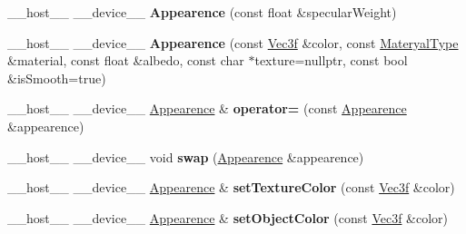 \begin{DoxyCompactItemize}
\item 
\+\_\+\+\_\+host\+\_\+\+\_\+ \+\_\+\+\_\+device\+\_\+\+\_\+ {\bfseries Appearence} (const float \&specular\+Weight)\hypertarget{struct_appearence_a457a7a1d0c4a661efb5448d01655e537}{}\label{struct_appearence_a457a7a1d0c4a661efb5448d01655e537}

\item 
\+\_\+\+\_\+host\+\_\+\+\_\+ \+\_\+\+\_\+device\+\_\+\+\_\+ {\bfseries Appearence} (const \hyperlink{class_vec3}{Vec3f} \&color, const \hyperlink{group__wrapping__and__description_ga4415a3504a4255d8563ded7496546564}{Materyal\+Type} \&material, const float \&albedo, const char $\ast$texture=nullptr, const bool \&is\+Smooth=true)\hypertarget{struct_appearence_abcd3db2310204d26344c19cf670b81e0}{}\label{struct_appearence_abcd3db2310204d26344c19cf670b81e0}

\item 
\+\_\+\+\_\+host\+\_\+\+\_\+ \+\_\+\+\_\+device\+\_\+\+\_\+ \hyperlink{struct_appearence}{Appearence} \& {\bfseries operator=} (const \hyperlink{struct_appearence}{Appearence} \&appearence)\hypertarget{struct_appearence_ab4b59a0771673522715acf447c011a31}{}\label{struct_appearence_ab4b59a0771673522715acf447c011a31}

\item 
\+\_\+\+\_\+host\+\_\+\+\_\+ \+\_\+\+\_\+device\+\_\+\+\_\+ void {\bfseries swap} (\hyperlink{struct_appearence}{Appearence} \&appearence)\hypertarget{struct_appearence_adc2b4fb34c57083f6dfa2c7c0f649ad5}{}\label{struct_appearence_adc2b4fb34c57083f6dfa2c7c0f649ad5}

\item 
\+\_\+\+\_\+host\+\_\+\+\_\+ \+\_\+\+\_\+device\+\_\+\+\_\+ \hyperlink{struct_appearence}{Appearence} \& {\bfseries set\+Texture\+Color} (const \hyperlink{class_vec3}{Vec3f} \&color)\hypertarget{struct_appearence_af4ea9859abcc70aa41c03258b161063d}{}\label{struct_appearence_af4ea9859abcc70aa41c03258b161063d}

\item 
\+\_\+\+\_\+host\+\_\+\+\_\+ \+\_\+\+\_\+device\+\_\+\+\_\+ \hyperlink{struct_appearence}{Appearence} \& {\bfseries set\+Object\+Color} (const \hyperlink{class_vec3}{Vec3f} \&color)\hypertarget{struct_appearence_a7c0ac1007f6b1ff26fc013a2b2f1b0bc}{}\label{struct_appearence_a7c0ac1007f6b1ff26fc013a2b2f1b0bc}

\end{DoxyCompactItemize}
